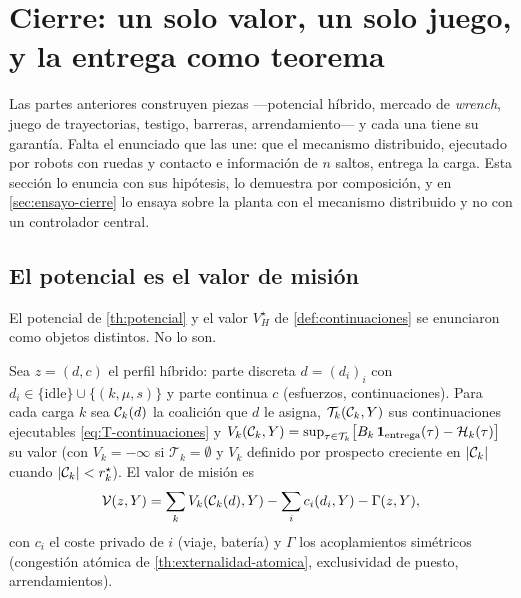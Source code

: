 \section{Cierre: un solo valor, un solo juego, y la entrega como teorema}
\label{sec:cierre}

Las partes anteriores construyen piezas —potencial híbrido, mercado de
\emph{wrench}, juego de trayectorias, testigo, barreras, arrendamiento— y cada
una tiene su garantía. Falta el enunciado que las une: que el mecanismo
distribuido, ejecutado por robots con ruedas y contacto e información de $n$
saltos, entrega la carga. Esta sección lo enuncia con sus hipótesis, lo
demuestra por composición, y en \cref{sec:ensayo-cierre} lo ensaya sobre la
planta con el mecanismo distribuido y no con un controlador central.

\subsection{El potencial es el valor de misión}

El potencial de \cref{th:potencial} y el valor $V_H^\star$ de
\cref{def:continuaciones} se enunciaron como objetos distintos. No lo son.

\begin{definicion}
\label{def:valor-unificado}
Sea $z=(d,c)$ el perfil híbrido: parte discreta $d=(d_i)_i$ con
$d_i\in\{\mathrm{idle}\}\cup\{(k,\mu,s)\}$ y parte continua $c$ (esfuerzos,
continuaciones). Para cada carga $k$ sea $\mathcal{C}_k(d)$ la coalición que $d$ le
asigna, $\mathcal T_k(\mathcal{C}_k,Y)$ sus continuaciones ejecutables
\eqref{eq:T-continuaciones} y $V_k(\mathcal{C}_k,Y)=\sup_{\tau\in\mathcal T_k}
\bigl[B_k\,\mathbf 1_{\text{entrega}}(\tau)-\mathcal H_k(\tau)\bigr]$ su valor
(con $V_k=-\infty$ si $\mathcal T_k=\emptyset$ y $V_k$ definido por
prospecto creciente en $|\mathcal{C}_k|$ cuando $|\mathcal{C}_k|<r_k^\star$). El valor de
misión es
\begin{equation}
  \label{eq:valor-unificado}
  \mathcal{V}(z,Y)=\sum_k V_k(\mathcal{C}_k(d),Y)-\sum_i c_i(d_i,Y)-\Gamma(z,Y),
\end{equation}
con $c_i$ el coste privado de $i$ (viaje, batería) y $\Gamma$ los
acoplamientos simétricos (congestión atómica de
\cref{th:externalidad-atomica}, exclusividad de puesto, arrendamientos).
\end{definicion}

